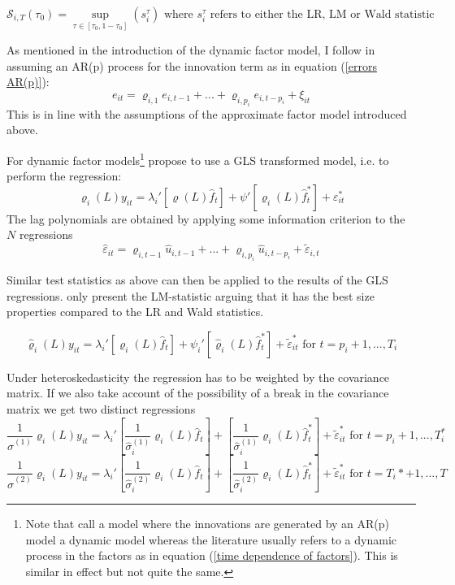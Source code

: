 \documentclass[12pt]{article}
\begin{document}
\begin{equation}
\label{sup LM statistic}
\mathscr{S}_{i,T}(\tau_0) = \sup_{\tau \in [\tau_0, 1-\tau_0]} (s_i^\tau) \text{ where $s_i^\tau$ refers to either the LR, LM or Wald statistic}
\end{equation}



As mentioned in the introduction of the dynamic factor model, I follow \citet{breitung2011testing} in assuming an AR(p) process for the innovation term as in equation (\ref{errors AR(p)}):
\begin{equation}
	\label{errors AR(p)}
	e_{it} = \varrho_{i, 1} e_{i, t-1} + ... + \varrho_{i, p_i} e_{i, t-p_i} + \xi_{it}
\end{equation}
This is in line with the assumptions of the approximate factor model introduced above.

For dynamic factor models\footnote{Note that \citet{breitung2011testing} call a model where the innovations are generated by an AR(p) model a dynamic model whereas the literature usually refers to a dynamic process in the factors as in equation (\ref{time dependence of factors}). This is similar in effect but not quite the same.} \citet{breitung2011testing} propose to use a GLS transformed model, i.e. to perform the regression:
$$\varrho_i(L) y_{it} = \lambda_i'[\varrho(L) \hat f_t] + \psi' [\varrho_i(L) \hat f_t^*] + \varepsilon^*_{it}$$
The lag polynomials are obtained by applying some information criterion to the $N$ regressions
$$\hat \varepsilon_{it} = \varrho_{i, t-1} \hat u_{i, t-1} + ... + \varrho_{i, p_i} \hat u_{i, t-p_i} + \tilde \varepsilon_{i,t}$$

Similar test statistics as above can then be applied to the results of the GLS regressions. \citet{breitung2011testing} only present the LM-statistic arguing that it has the best size properties compared to the LR and Wald statistics.

$$\hat \varrho_i(L) y_{it} = \lambda_i' \left[\varrho_i(L) \hat f_t\right] + \psi_i' \left[\hat \varrho_i(L) \hat f_t^*\right] + \tilde \varepsilon^*_{it} \text{ for } t= p_i+1, ..., T_i$$

Under heteroskedasticity the regression has to be weighted by the covariance matrix. If we also take account of the possibility of a break in the covariance matrix we get two distinct regressions
$$\frac{1}{\hat \sigma^{(1)}} \varrho_i(L) y_{it} = \lambda_i' \left[\frac{1}{\hat \sigma_i^{(1)}} \varrho_i(L) \hat f_t\right] + \left[\frac{1}{\hat \sigma_i^{(1)}} \varrho_i(L) \hat f_t^*\right] + \tilde \varepsilon^*_{it} \text{ for } t = p_i+1, ..., T^*_i$$
$$\frac{1}{\hat \sigma^{(2)}} \varrho_i(L) y_{it} = \lambda_i' \left[\frac{1}{\hat \sigma_i^{(2)}} \varrho_i(L) \hat f_t\right] + \left[\frac{1}{\hat \sigma_i^{(2)}} \varrho_i(L) \hat f_t^*\right] + \tilde \varepsilon^*_{it} \text{ for } t = T_i*+1, ..., T$$
\end{document}
